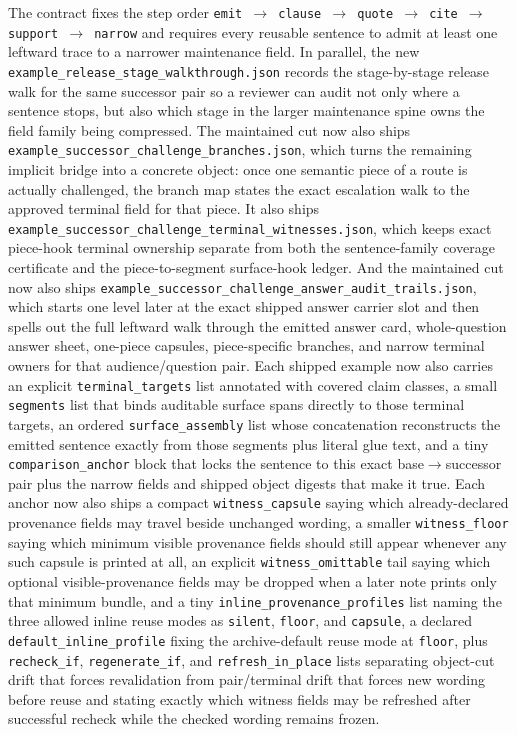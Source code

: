 \documentclass[11pt]{article}
\begin{document}
The contract fixes the step order \texttt{emit $\to$ clause $\to$ quote $\to$ cite $\to$ support $\to$ narrow} and requires every reusable sentence to admit at least one leftward trace to a narrower maintenance field. In parallel, the new \texttt{example\_release\_stage\_walkthrough.json} records the stage-by-stage release walk for the same successor pair so a reviewer can audit not only where a sentence stops, but also which stage in the larger maintenance spine owns the field family being compressed. The maintained cut now also ships \texttt{example\_successor\_challenge\_branches.json}, which turns the remaining implicit bridge into a concrete object: once one semantic piece of a route is actually challenged, the branch map states the exact escalation walk to the approved terminal field for that piece. It also ships \texttt{example\_successor\_challenge\_terminal\_witnesses.json}, which keeps exact piece-hook terminal ownership separate from both the sentence-family coverage certificate and the piece-to-segment surface-hook ledger. And the maintained cut now also ships \texttt{example\_successor\_challenge\_answer\_audit\_trails.json}, which starts one level later at the exact shipped answer carrier slot and then spells out the full leftward walk through the emitted answer card, whole-question answer sheet, one-piece capsules, piece-specific branches, and narrow terminal owners for that audience/question pair.
Each shipped example now also carries an explicit \texttt{terminal\_targets} list annotated with covered claim classes, a small \texttt{segments} list that binds auditable surface spans directly to those terminal targets, an ordered \texttt{surface\_assembly} list whose concatenation reconstructs the emitted sentence exactly from those segments plus literal glue text, and a tiny \texttt{comparison\_anchor} block that locks the sentence to this exact base$\to$successor pair plus the narrow fields and shipped object digests that make it true. Each anchor now also ships a compact \texttt{witness\_capsule} saying which already-declared provenance fields may travel beside unchanged wording, a smaller \texttt{witness\_floor} saying which minimum visible provenance fields should still appear whenever any such capsule is printed at all, an explicit \texttt{witness\_omittable} tail saying which optional visible-provenance fields may be dropped when a later note prints only that minimum bundle, and a tiny \texttt{inline\_provenance\_profiles} list naming the three allowed inline reuse modes as \texttt{silent}, \texttt{floor}, and \texttt{capsule}, a declared \texttt{default\_inline\_profile} fixing the archive-default reuse mode at \texttt{floor}, plus \texttt{recheck\_if}, \texttt{regenerate\_if}, and \texttt{refresh\_in\_place} lists separating object-cut drift that forces revalidation from pair/terminal drift that forces new wording before reuse and stating exactly which witness fields may be refreshed after successful recheck while the checked wording remains frozen.
\end{document}
